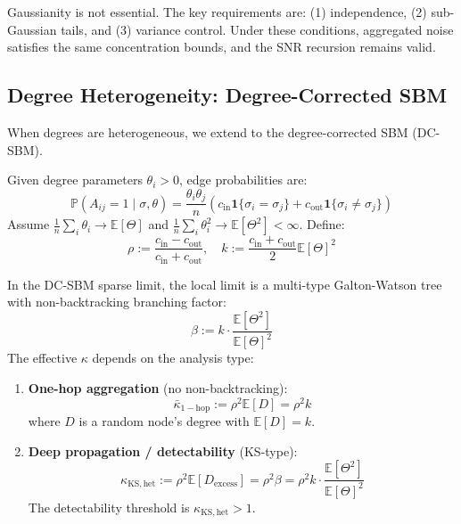 \begin{remark}
Gaussianity is not essential. The key requirements are: (1) independence, (2) sub-Gaussian tails, and (3) variance control. Under these conditions, aggregated noise satisfies the same concentration bounds, and the SNR recursion remains valid.
\end{remark}

\subsection{Degree Heterogeneity: Degree-Corrected SBM}
\label{subsec:dcsbm}

When degrees are heterogeneous, we extend to the degree-corrected SBM (DC-SBM).

\begin{definition}
\label{def:dcsbm}
Given degree parameters $\theta_i > 0$, edge probabilities are:
\begin{equation}
    \mathbb{P}(A_{ij} = 1 \mid \sigma, \theta) = \frac{\theta_i \theta_j}{n} \left(c_{\mathrm{in}} \mathbf{1}\{\sigma_i = \sigma_j\} + c_{\mathrm{out}} \mathbf{1}\{\sigma_i \neq \sigma_j\}\right)
\end{equation}
Assume $\frac{1}{n}\sum_i \theta_i \to \mathbb{E}[\Theta]$ and $\frac{1}{n}\sum_i \theta_i^2 \to \mathbb{E}[\Theta^2] < \infty$. Define:
\begin{equation}
    \rho := \frac{c_{\mathrm{in}} - c_{\mathrm{out}}}{c_{\mathrm{in}} + c_{\mathrm{out}}}, \quad
    k := \frac{c_{\mathrm{in}} + c_{\mathrm{out}}}{2} \mathbb{E}[\Theta]^2
\end{equation}
\end{definition}

\begin{theorem}
\label{thm:dcsbm_kappa}
In the DC-SBM sparse limit, the local limit is a multi-type Galton-Watson tree with non-backtracking branching factor:
\begin{equation}
    \beta := k \cdot \frac{\mathbb{E}[\Theta^2]}{\mathbb{E}[\Theta]^2}
\end{equation}
The effective $\kappa$ depends on the analysis type:
\begin{enumerate}
    \item \textbf{One-hop aggregation} (no non-backtracking):
    \begin{equation}
        \bar{\kappa}_{\mathrm{1-hop}} := \rho^2 \mathbb{E}[D] = \rho^2 k
    \end{equation}
    where $D$ is a random node's degree with $\mathbb{E}[D] = k$.

    \item \textbf{Deep propagation / detectability} (KS-type):
    \begin{equation}
        \kappa_{\mathrm{KS,het}} := \rho^2 \mathbb{E}[D_{\mathrm{excess}}] = \rho^2 \beta = \rho^2 k \cdot \frac{\mathbb{E}[\Theta^2]}{\mathbb{E}[\Theta]^2}
    \end{equation}
    The detectability threshold is $\kappa_{\mathrm{KS,het}} > 1$.
\end{enumerate}
\end{theorem}

